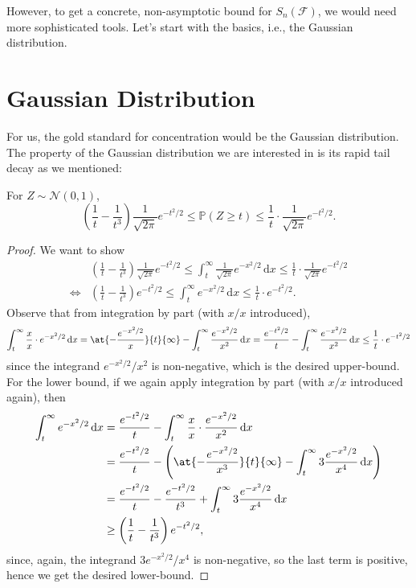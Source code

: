 However, to get a concrete, non-asymptotic bound for \(S_n(\mathscr{F} )\), we would need more sophisticated tools. Let's start with the basics, i.e., the Gaussian distribution.

\section{Gaussian Distribution}
For us, the gold standard for concentration would be the Gaussian distribution. The property of the Gaussian distribution we are interested in is its rapid tail decay as we mentioned:

\begin{lemma}\label{lma:Gaussian-tail-bound}
	For \(Z \sim \mathcal{N} (0, 1)\),
	\[
		\left( \frac{1}{t} - \frac{1}{t^3} \right) \frac{1}{\sqrt{2\pi } } e^{- t^2 / 2} \leq \mathbb{P}(Z \geq t) \leq \frac{1}{t} \cdot \frac{1}{\sqrt{2\pi } } e^{- t^2 / 2}.
	\]
\end{lemma}
\begin{proof}
	We want to show
	\[
		\begin{split}
			&\left( \frac{1}{t} - \frac{1}{t^3} \right) \frac{1}{\sqrt{2\pi } } e^{-t^2 / 2}
			\leq \int_{t}^{\infty} \frac{1}{\sqrt{2\pi } } e^{- x^2 / 2} \,\mathrm{d}x
			\leq \frac{1}{t}\cdot \frac{1}{\sqrt{2\pi } } e^{-t^2 / 2}\\
			\iff &\left( \frac{1}{t} - \frac{1}{t^3} \right) e^{-t^2 / 2}
			\leq \int_{t}^{\infty} e^{- x^2 / 2} \,\mathrm{d}x
			\leq \frac{1}{t}\cdot e^{-t^2 / 2}.
		\end{split}
	\]
	Observe that from integration by part (with \(x / x\) introduced),
	\[
		\int_{t}^{\infty} \frac{x}{x}\cdot e^{-x^2 / 2} \,\mathrm{d}x
		= \at{- \frac{e^{-x^2 / 2}}{x}}{t}{\infty } - \int_{t}^{\infty} \frac{e^{-x^2 / 2}}{x^2} \,\mathrm{d}x
		= \frac{e^{-t^2 / 2}}{t} - \int_{t}^{\infty} \frac{e^{-x^2 / 2}}{x^2} \,\mathrm{d}x
		\leq \frac{1}{t}\cdot e^{-t^2 / 2}
	\]
	since the integrand \(e^{-x^2 / 2} / x^2\) is non-negative, which is the desired upper-bound. For the lower bound, if we again apply integration by part (with \(x / x\) introduced again), then
	\[
		\begin{split}
			\int_{t}^{\infty} e^{-x^2 / 2} \,\mathrm{d}x
			&= \frac{e^{-t^2 / 2}}{t} - \int_{t}^{\infty} \frac{x}{x} \cdot \frac{e^{-x^2 / 2}}{x^2} \,\mathrm{d}x\\
			&= \frac{e^{-t^2 / 2}}{t} - \left( \at{- \frac{e^{-x^2 / 2}}{x^3}}{t}{\infty } - \int_{t}^{\infty} 3 \frac{e^{-x^2 / 2}}{x^4} \,\mathrm{d}x \right)\\
			&= \frac{e^{-t^2 / 2}}{t} - \frac{e^{-t^2 / 2}}{t^3} + \int_{t}^{\infty} 3 \frac{e^{-x^2 / 2}}{x^4} \,\mathrm{d}x\\
			&\geq \left( \frac{1}{t} - \frac{1}{t^3} \right) e^{-t^2 / 2},
		\end{split}
	\]
	since, again, the integrand \(3 e^{-x^2 / 2} / x^4\) is non-negative, so the last term is positive, hence we get the desired lower-bound.
\end{proof}

